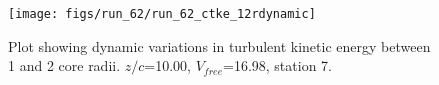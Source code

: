 \begin{figure}[H]
\centering
\texttt{[image: figs/run\_62/run\_62\_ctke\_12rdynamic]}
\caption{Plot showing dynamic variations in turbulent kinetic energy between 1 and 2 core radii. $z/c$=10.00, $V_{free}$=16.98, station 7.}
\label{fig:run_62_ctke_12rdynamic}
\end{figure}


